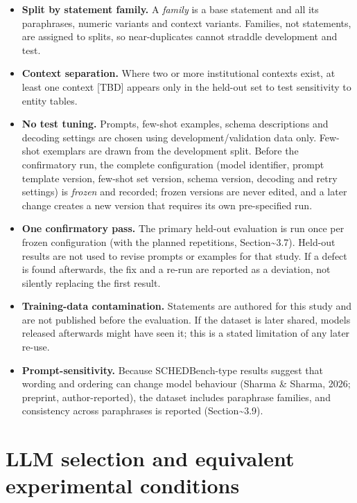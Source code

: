 \documentclass[
  11pt,a4paper,oneside]{report}
\begin{document}
\begin{itemize}
  which held-out item matched; a flagged family is discarded or rewritten.
\item
  \textbf{Split by statement family.} A \emph{family} is a base
  statement and all its paraphrases, numeric variants and context
  variants. Families, not statements, are assigned to splits, so
  near-duplicates cannot straddle development and test.
\item
  \textbf{Context separation.} Where two or more institutional contexts
  exist, at least one context {[}TBD{]} appears only in the held-out set
  to test sensitivity to entity tables.
\item
  \textbf{No test tuning.} Prompts, few-shot examples, schema
  descriptions and decoding settings are chosen using
  development/validation data only. Few-shot exemplars are drawn from
  the development split. Before the confirmatory run, the complete
  configuration (model identifier, prompt template version, few-shot set
  version, schema version, decoding and retry settings) is \emph{frozen}
  and recorded; frozen versions are never edited, and a later change
  creates a new version that requires its own pre-specified run.
\item
  \textbf{One confirmatory pass.} The primary held-out evaluation is run
  once per frozen configuration (with the planned repetitions,
  Section\textasciitilde3.7). Held-out results are not used to revise
  prompts or examples for that study. If a defect is found afterwards,
  the fix and a re-run are reported as a deviation, not silently
  replacing the first result.
\item
  \textbf{Training-data contamination.} Statements are authored for this
  study and are not published before the evaluation. If the dataset is
  later shared, models released afterwards might have seen it; this is a
  stated limitation of any later re-use.
\item
  \textbf{Prompt-sensitivity.} Because SCHEDBench-type results suggest
  that wording and ordering can change model behaviour (Sharma \&
  Sharma, 2026; preprint, author-reported), the dataset includes
  paraphrase families, and consistency across paraphrases is reported
  (Section\textasciitilde3.9).
\end{itemize}

\hypertarget{llm-selection-and-equivalent-experimental-conditions}{%
\section{LLM selection and equivalent experimental
conditions}\label{llm-selection-and-equivalent-experimental-conditions}}
\end{document}
